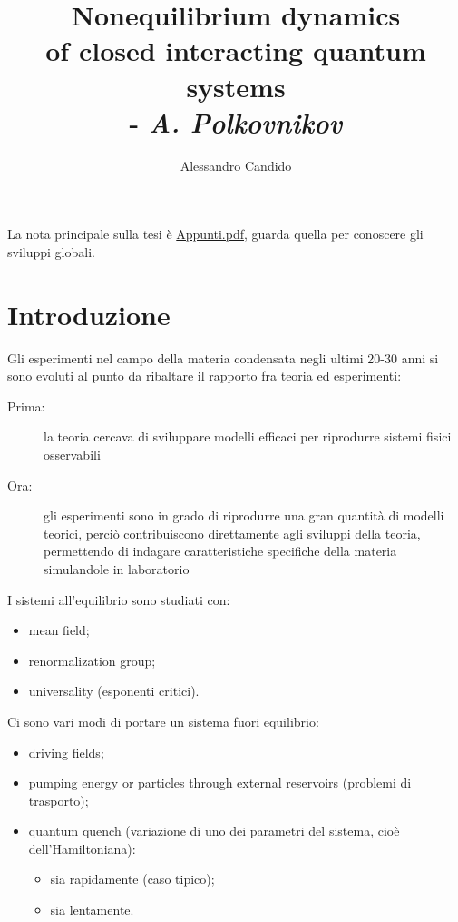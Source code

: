 \documentclass[a4paper,10pt,twocolumn]{article}
\title{Nonequilibrium dynamics\\ of closed interacting quantum systems\\ - \textit{A. Polkovnikov}}
\author{Alessandro Candido}
\begin{document}
\maketitle

\tableofcontents

\section*{}

La nota principale sulla tesi è \href{./Appunti.pdf}{Appunti.pdf}, guarda quella per conoscere gli sviluppi globali.


\section{Introduzione}

Gli esperimenti nel campo della materia condensata negli ultimi 20-30 anni si sono evoluti al punto da ribaltare il rapporto fra teoria ed esperimenti:

\begin{description}
	\item[Prima:] la teoria cercava di sviluppare modelli efficaci per riprodurre sistemi fisici osservabili
	\item[Ora:] gli esperimenti sono in grado di riprodurre una gran quantità di modelli teorici, perciò contribuiscono direttamente agli sviluppi della teoria, permettendo di indagare caratteristiche specifiche della materia simulandole in laboratorio
\end{description}

\noindent I sistemi all'equilibrio sono studiati con:

\begin{itemize}
	\item mean field;
	\item renormalization group;
	\item universality (esponenti critici).
\end{itemize}

\noindent Ci sono vari modi di portare un sistema fuori equilibrio:

\begin{itemize}
	\item driving fields;
	\item pumping energy or particles through external reservoirs (problemi di trasporto);
	\item quantum quench (variazione di uno dei parametri del sistema, cioè dell'Hamiltoniana):
		\begin{itemize}
			\item sia rapidamente (caso tipico);
			\item sia lentamente.
		\end{itemize}
\end{itemize}
\end{document}
